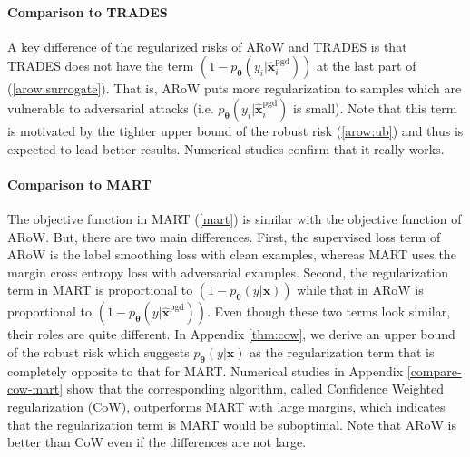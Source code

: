 \documentclass[nohyperref]{article}
\theoremstyle{plain}
\theoremstyle{definition}
\theoremstyle{remark}
\begin{document}
\paragraph{Comparison to TRADES}

A key difference of the regularized risks
of ARoW and TRADES is that TRADES does not have
the term  $(1- p_{\bm{\theta}}(y_i|\widehat{\bm{x}}^{\text{pgd}}_i))$
at the last part of (\ref{arow:surrogate}).
That is, ARoW puts more regularization to
samples which are vulnerable to
adversarial attacks (i.e. $p_{\bm{\theta}}(y_i|\widehat{\bm{x}}^{\text{pgd}}_i)$ is small). Note that this term is motivated by the tighter upper bound of the robust risk (\ref{arow:ub}) and thus is expected to lead better results. Numerical studies confirm that it really works.

\paragraph{Comparison to MART}
The objective function in MART (\ref{mart}) is similar with the objective function of ARoW. 
But, there are two main differences. 
First, the supervised loss term of ARoW is the label smoothing loss with clean examples, whereas MART uses the margin cross entropy loss with adversarial examples.
Second, the regularization term in MART is proportional to $(1-p_{\bm{\theta}}(y|\bm{x}))$  while that in ARoW is proportional to $(1-p_{\bm{\theta}}(y|\widehat{\bm{x}}^{\text{pgd}})).$
Even though these two terms look similar, their roles are quite different.
In Appendix \ref{thm:cow}, we derive an upper bound of the robust risk which suggests
$p_{\bm{\theta}}(y|\bm{x})$ as the regularization term that is completely opposite to
that for MART. Numerical studies in Appendix \ref{compare-cow-mart} show that 
the corresponding algorithm, called Confidence Weighted regularization (CoW), outperforms MART with large margins, which indicates that the regularization term is MART
would be suboptimal. Note that ARoW is better than CoW even if the differences are not large.
\end{document}
